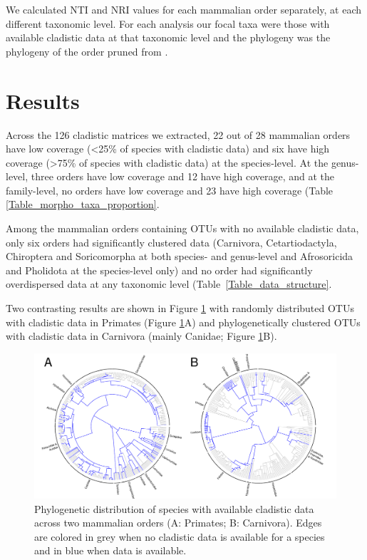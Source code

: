 We calculated NTI and NRI values for each mammalian order separately, at each different taxonomic level. 
For each analysis our focal taxa were those with available cladistic data at that taxonomic level and the phylogeny was the phylogeny of the order pruned from \citep{BinindaEmonds}.

%
%

\section{Results}
Across the 126 cladistic matrices we extracted, 22 out of 28 mammalian orders have low coverage (\textless 25\% of species with cladistic data) and six have high coverage (\textgreater 75\% of species with cladistic data) at the species-level.
At the genus-level, three orders have low coverage and 12 have high coverage, and at the family-level, no orders have low coverage and 23 have high coverage (Table \ref{Table_morpho_taxa_proportion}.



Among the mammalian orders containing OTUs with no available cladistic data, only six orders had significantly clustered data (Carnivora, Cetartiodactyla, Chiroptera and Soricomorpha at both species- and genus-level and Afrosoricida and Pholidota at the species-level only) and no order had significantly overdispersed data at any taxonomic level (Table~\ref{Table_data_structure}.

Two contrasting results are shown in Figure \ref{Figure_example_coverage} with randomly distributed OTUs with cladistic data in Primates (Figure \ref{Figure_example_coverage}A) and phylogenetically clustered OTUs with cladistic data in Carnivora (mainly Canidae; Figure \ref{Figure_example_coverage}B).

\begin{figure}[!htbp]
\centering
    \includegraphics[width=1\textwidth]{Missing_mammals/Figures/example_coverage.pdf}
\caption{Phylogenetic distribution of species with available cladistic data across two mammalian orders (A: Primates; B: Carnivora).
Edges are colored in grey when no cladistic data is available for a species and in blue when data is available.}
\label{Figure_example_coverage}
\end{figure}

